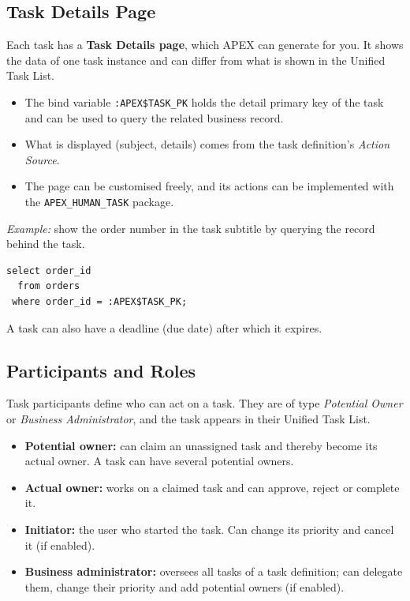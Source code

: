 \documentclass[11pt,a4paper]{article}
\begin{document}
\subsection{Task Details Page}
Each task has a \textbf{Task Details page}, which APEX can generate for you. It shows the data of one task instance and can differ from what is shown in the Unified Task List.
\begin{itemize}
\item The bind variable \texttt{:APEX\$TASK\_PK} holds the detail primary key of the task and can be used to query the related business record.
\item What is displayed (subject, details) comes from the task definition's \emph{Action Source}.
\item The page can be customised freely, and its actions can be implemented with the \texttt{APEX\_HUMAN\_TASK} package.
\end{itemize}

\textit{Example:} show the order number in the task subtitle by querying the record behind the task.
\begin{lstlisting}
select order_id
  from orders
 where order_id = :APEX$TASK_PK;
\end{lstlisting}

A task can also have a deadline (due date) after which it expires.

\subsection{Participants and Roles}
Task participants define who can act on a task. They are of type \emph{Potential Owner} or \emph{Business Administrator}, and the task appears in their Unified Task List.
\begin{itemize}
\item \textbf{Potential owner:} can claim an unassigned task and thereby become its actual owner. A task can have several potential owners.
\item \textbf{Actual owner:} works on a claimed task and can approve, reject or complete it.
\item \textbf{Initiator:} the user who started the task. Can change its priority and cancel it (if enabled).
\item \textbf{Business administrator:} oversees all tasks of a task definition; can delegate them, change their priority and add potential owners (if enabled).
\end{itemize}
\end{document}
